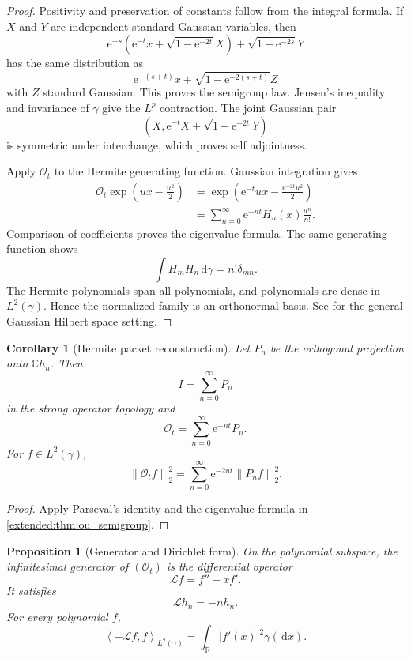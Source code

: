 \documentclass[11pt,a4paper]{article}
\newtheorem{proposition}[theorem]{Proposition}
\newtheorem{corollary}[theorem]{Corollary}
\theoremstyle{definition}
\theoremstyle{remark}
\newcommand{\norm}[1]{\left\lVert#1\right\rVert}
\newcommand{\CC}{\mathbb C}
\newcommand{\RR}{\mathbb R}
\newcommand{\Lcal}{\mathcal L}
\newcommand{\Ocal}{\mathcal O}
\newcommand{\e}{\mathrm e}
\newcommand{\dd}{\,\mathrm d}
\newcommand{\abs}[1]{\left\lvert#1\right\rvert}
\newcommand{\ip}[2]{\left\langle#1,#2\right\rangle}
\begin{document}
\begin{proof}
Positivity and preservation of constants follow from the integral formula. If \(X\) and \(Y\) are independent standard Gaussian variables, then
\[
\e^{-s}
\left(
\e^{-t}x+\sqrt{1-\e^{-2t}}X
\right)
+
\sqrt{1-\e^{-2s}}Y
\]
has the same distribution as
\[
\e^{-(s+t)}x
+
\sqrt{1-\e^{-2(s+t)}}Z
\]
with \(Z\) standard Gaussian. This proves the semigroup law. Jensen's inequality and invariance of \(\gamma\) give the \(L^p\) contraction. The joint Gaussian pair
\[
\left(
X,
\e^{-t}X+\sqrt{1-\e^{-2t}}Y
\right)
\]
is symmetric under interchange, which proves self adjointness.

Apply \(\Ocal_t\) to the Hermite generating function. Gaussian integration gives
\[
\begin{aligned}
\Ocal_t
\exp\left(ux-\frac{u^2}{2}\right)
&=
\exp\left(
\e^{-t}ux-
\frac{\e^{-2t}u^2}{2}
\right)\\
&=
\sum_{n=0}^\infty
\e^{-nt}H_n(x)\frac{u^n}{n!}.
\end{aligned}
\]
Comparison of coefficients proves the eigenvalue formula. The same generating function shows
\[
\int H_mH_n\dd\gamma=n!\delta_{mn}.
\]
The Hermite polynomials span all polynomials, and polynomials are dense in \(L^2(\gamma)\). Hence the normalized family is an orthonormal basis. See \cite{Janson1997} for the general Gaussian Hilbert space setting.
\end{proof}

\begin{corollary}[Hermite packet reconstruction]\label{extended:record:041}\label{extended:cor:hermite_packets}
Let \(P_n\) be the orthogonal projection onto \(\CC h_n\). Then
\[
I=\sum_{n=0}^\infty P_n
\]
in the strong operator topology and
\[
\Ocal_t
=
\sum_{n=0}^\infty\e^{-nt}P_n.
\]
For \(f\in L^2(\gamma)\),
\[
\norm{\Ocal_t f}_2^2
=
\sum_{n=0}^\infty
\e^{-2nt}\norm{P_nf}_2^2.
\]
\end{corollary}

\begin{proof}
Apply Parseval's identity and the eigenvalue formula in \cref{extended:thm:ou_semigroup}.
\end{proof}

\begin{proposition}[Generator and Dirichlet form]\label{extended:record:042}\label{extended:prop:ou_generator}
On the polynomial subspace, the infinitesimal generator of \((\Ocal_t)\) is the differential operator
\[
\Lcal f=f''-xf'.
\]
It satisfies
\[
\Lcal h_n=-nh_n.
\]
For every polynomial \(f\),
\[
\ip{-\Lcal f}{f}_{L^2(\gamma)}
=
\int_\RR\abs{f'(x)}^2\gamma(\dd x).
\]
\end{proposition}
\end{document}
